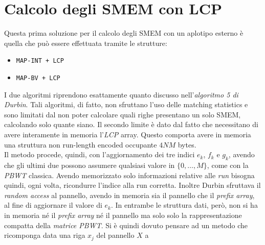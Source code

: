 \section{Calcolo degli SMEM con LCP}
Questa prima soluzione per il calcolo degli SMEM con un aplotipo esterno è
quella che può essere effettuata tramite le strutture:
\begin{itemize}
  \item \texttt{MAP-INT + LCP}
  \item \texttt{MAP-BV + LCP}
\end{itemize}
I due algoritmi riprendono esattamente quanto discusso nell'\textit{algoritmo 5
  di Durbin}. Tali algoritmi, di 
fatto, non sfruttano l'uso delle matching statistics e sono limitati dal non
poter calcolare quali righe presentano un solo SMEM, calcolando solo quante
siano. Il secondo limite è dato dal fatto che necessitano di avere interamente
in memoria l'\textit{LCP} array. Questo comporta avere in memoria una
struttura non run-length encoded occupante $4NM$ bytes.\\
Il metodo procede, quindi, con l'aggiornamento dei tre indici $e_k$, $f_k$ e
$g_k$, avendo che gli ultimi due possono assumere qualsiasi valore in
$\{0,\ldots, M\}$,
come con la \textit{PBWT} classica. Avendo memorizzato solo informazioni
relative alle \textit{run} bisogna quindi, ogni volta, ricondurre l'indice alla
run corretta.
Inoltre Durbin sfruttava il \textit{random access} al pannello, avendo in
memoria sia il pannello che il \textit{prefix array}, al fine di aggiornare il
valore di $e_k$. In entrambe le struttura dati, però,
non si ha in memoria né il \textit{prefix array} né il pannello ma solo solo la
rappresentazione compatta della \textit{matrice PBWT}. Si è quindi dovuto
pensare ad un metodo che ricomponga data una riga $x_j$ del pannello $X$ a
